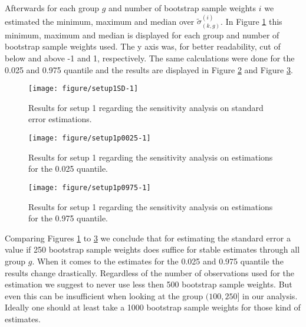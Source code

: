 \documentclass{scrartcl}\usepackage[]{graphicx}\usepackage[]{color}
\makeatletter
\def\maxwidth{ %
  \ifdim\Gin@nat@width>\linewidth
    \linewidth
  \else
    \Gin@nat@width
  \fi
}
\newenvironment{knitrout}{}{} %
\makeatother
\begin{document}
Afterwards for each group $g$ and number of bootstrap sample weights $i$ we estimated the minimum, maximum and median over $\tilde{\sigma}^{(i)}_{(k,g)}$. In Figure \ref{fig:setup1SD} this minimum, maximum and median is displayed for each group and number of bootstrap sample weights used. The y axis was, for better readability, cut of below and above -1 and 1, respectively. The same calculations were done for the 0.025 and 0.975 quantile and the results are displayed in Figure \ref{fig:setup1p0025} and Figure \ref{fig:setup1p0975}.




\begin{knitrout}
\color{fgcolor}\begin{figure}
\texttt{[image: figure/setup1SD-1]} \caption[Results for setup 1 regarding the sensitivity analysis on standard error estimations]{Results for setup 1 regarding the sensitivity analysis on standard error estimations.}\label{fig:setup1SD}
\end{figure}


\end{knitrout}


\begin{knitrout}
\color{fgcolor}\begin{figure}
\texttt{[image: figure/setup1p0025-1]} \caption[Results for setup 1 regarding the sensitivity analysis on estimations for the 0.025 quantile]{Results for setup 1 regarding the sensitivity analysis on estimations for the 0.025 quantile.}\label{fig:setup1p0025}
\end{figure}


\end{knitrout}

\begin{knitrout}
\color{fgcolor}\begin{figure}
\texttt{[image: figure/setup1p0975-1]} \caption[Results for setup 1 regarding the sensitivity analysis on estimations for the 0.975 quantile]{Results for setup 1 regarding the sensitivity analysis on estimations for the 0.975 quantile.}\label{fig:setup1p0975}
\end{figure}


\end{knitrout}

Comparing Figures \ref{fig:setup1SD} to \ref{fig:setup1p0975} we conclude that for estimating the standard error a value if 250 bootstrap sample weights does suffice for stable estimates through all group $g$. When it comes to the estimates for the 0.025 and 0.975 quantile the results change drastically. Regardless of the number of observations used for the estimation we suggest to never use less then 500 bootstrap sample weights. But even this can be insufficient when looking at the group $(100,250]$ in our analysis. Ideally one should at least take a 1000 bootstrap sample weights for those kind of estimates.
\end{document}
